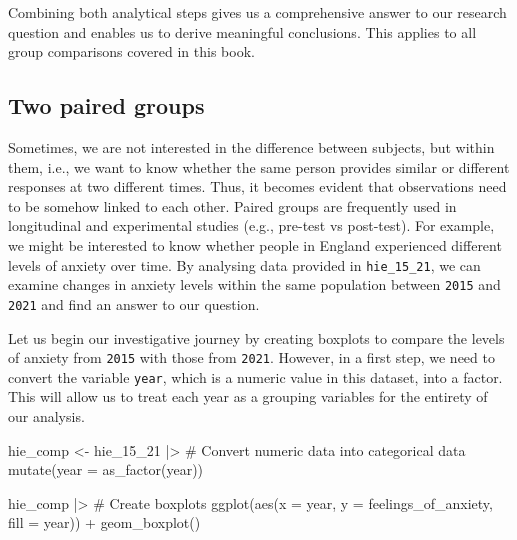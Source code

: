 \documentclass[
  letterpaper,
]{krantz}
\makeatletter
\newenvironment{Shaded}{\begin{snugshade}}{\end{snugshade}}
\newcommand{\AttributeTok}[1]{\textcolor[rgb]{0.40,0.45,0.13}{#1}}
\newcommand{\CommentTok}[1]{\textcolor[rgb]{0.37,0.37,0.37}{#1}}
\newcommand{\FunctionTok}[1]{\textcolor[rgb]{0.28,0.35,0.67}{#1}}
\newcommand{\NormalTok}[1]{\textcolor[rgb]{0.00,0.23,0.31}{#1}}
\newcommand{\OtherTok}[1]{\textcolor[rgb]{0.00,0.23,0.31}{#1}}
\newcommand{\SpecialCharTok}[1]{\textcolor[rgb]{0.37,0.37,0.37}{#1}}
\newenvironment{kframe}{%
\medskip{}
\setlength{\fboxsep}{.8em}
 \def\at@end@of@kframe{}%
 \ifinner\ifhmode%
  \def\at@end@of@kframe{\end{minipage}}%
  \begin{minipage}{\columnwidth}%
 \fi\fi%
 \def\FrameCommand##1{\hskip\@totalleftmargin \hskip-\fboxsep
 \colorbox{shadecolor}{##1}\hskip-\fboxsep
     \hskip-\linewidth \hskip-\@totalleftmargin \hskip\columnwidth}%
 \MakeFramed {\advance\hsize-\width
   \@totalleftmargin\z@ \linewidth\hsize
   \@setminipage}}%
 {\par\unskip\endMakeFramed%
 \at@end@of@kframe}
\renewenvironment{Shaded}{\begin{kframe}}{\end{kframe}}
\makeatother
\begin{document}
Combining both analytical steps gives us a comprehensive answer to our
research question and enables us to derive meaningful conclusions. This
applies to all group comparisons covered in this book.

\subsection{Two paired groups}\label{sec-two-paired-groups}

Sometimes, we are not interested in the difference between subjects, but
within them, i.e., we want to know whether the same person provides
similar or different responses at two different times. Thus, it becomes
evident that observations need to be somehow linked to each other.
Paired groups are frequently used in longitudinal and experimental
studies (e.g., pre-test vs post-test). For example, we might be
interested to know whether people in England experienced different
levels of anxiety over time. By analysing data provided in
\texttt{hie\_15\_21}, we can examine changes in anxiety levels within
the same population between \texttt{2015} and \texttt{2021} and find an
answer to our question.

Let us begin our investigative journey by creating boxplots to compare
the levels of anxiety from \texttt{2015} with those from \texttt{2021}.
However, in a first step, we need to convert the variable \texttt{year},
which is a numeric value in this dataset, into a factor. This will allow
us to treat each year as a grouping variables for the entirety of our
analysis.

\begin{Shaded}
\begin{Highlighting}[]
\NormalTok{hie\_comp }\OtherTok{\textless{}{-}}
\NormalTok{  hie\_15\_21 }\SpecialCharTok{|\textgreater{}}
  \CommentTok{\# Convert numeric data into categorical data}
  \FunctionTok{mutate}\NormalTok{(}\AttributeTok{year =} \FunctionTok{as\_factor}\NormalTok{(year))}

\NormalTok{hie\_comp }\SpecialCharTok{|\textgreater{}}  
  \CommentTok{\# Create boxplots}
  \FunctionTok{ggplot}\NormalTok{(}\FunctionTok{aes}\NormalTok{(}\AttributeTok{x =}\NormalTok{ year,}
             \AttributeTok{y =}\NormalTok{ feelings\_of\_anxiety,}
             \AttributeTok{fill =}\NormalTok{ year)) }\SpecialCharTok{+}
  \FunctionTok{geom\_boxplot}\NormalTok{()}
\end{Highlighting}
\end{Shaded}
\end{document}

